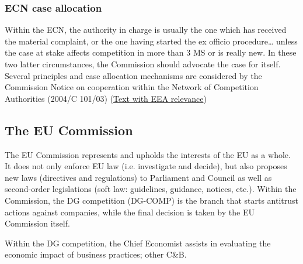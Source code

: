         \subsubsection{ECN case allocation}

            Within the ECN, the authority in charge is usually the one which has received the material complaint, or the one having started the ex officio procedure… unless the case at stake affects competition in more than 3 MS or is really new. In these two latter circumstances, the Commission should advocate the case for itself. Several principles and case allocation mechanisms are considered by the Commission Notice on cooperation within the Network of Competition Authorities (2004/C 101/03) (\href{https://eur-lex.europa.eu/legal-content/EN/TXT/HTML/?uri=CELEX:52004XC0427(02)&from=EN}{Text with EEA relevance})

            

    \subsection{The EU Commission}

        The EU Commission represents and upholds the interests of the EU as a whole. It does not only enforce EU law (i.e. investigate and decide), but also proposes new laws (directives and regulations) to Parliament and Council as well as second-order legislations (soft law: guidelines, guidance, notices, etc.). Within the Commission, the DG competition (DG-COMP) is the branch that starts antitrust actions against companies, while the final decision is taken by the EU Commission itself.


        Within the DG competition, the Chief Economist assists in evaluating the economic impact of business practices; other C\&B.

